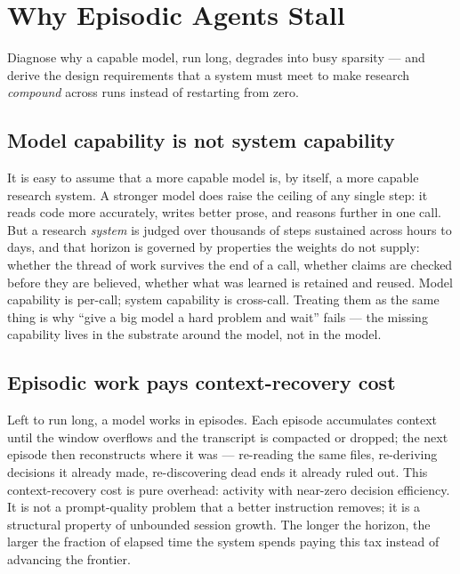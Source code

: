 \section{Why Episodic Agents Stall}
\label{sec:episodic}

\begin{designbox}
Diagnose why a capable model, run long, degrades into busy sparsity --- and derive
the design requirements that a system must meet to make research \emph{compound}
across runs instead of restarting from zero.
\end{designbox}

\subsection{Model capability is not system capability}

It is easy to assume that a more capable model is, by itself, a more capable
research system. A stronger model does raise the ceiling of any single step: it
reads code more accurately, writes better prose, and reasons further in one call.
But a research \emph{system} is judged over thousands of steps sustained across
hours to days, and that horizon is governed by properties the weights do not
supply: whether the thread of work survives the end of a call, whether claims are
checked before they are believed, whether what was learned is retained and reused.
Model capability is per-call; system capability is cross-call. Treating them as the
same thing is why ``give a big model a hard problem and wait'' fails --- the missing
capability lives in the substrate around the model, not in the model.

\subsection{Episodic work pays context-recovery cost}

Left to run long, a model works in episodes. Each episode accumulates context
until the window overflows and the transcript is compacted or dropped; the next
episode then reconstructs where it was --- re-reading the same files, re-deriving
decisions it already made, re-discovering dead ends it already ruled out. This
context-recovery cost is pure overhead: activity with near-zero decision
efficiency. It is not a prompt-quality problem that a better instruction removes;
it is a structural property of unbounded session growth. The longer the horizon,
the larger the fraction of elapsed time the system spends paying this tax instead
of advancing the frontier.

